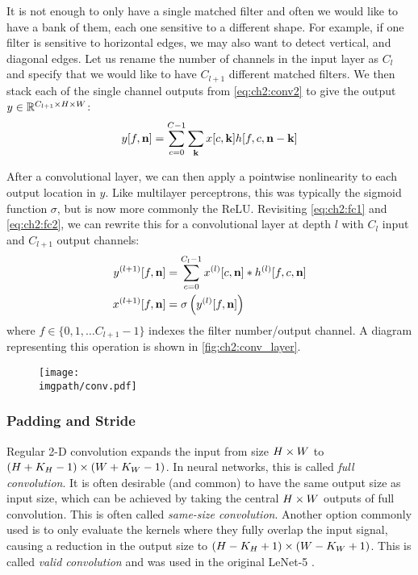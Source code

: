 It is not enough to only have a single matched filter and often we would like to
have a bank of them, each one sensitive to a different shape. For example, if
one filter is sensitive to horizontal edges, we may also want to detect vertical, and
diagonal edges. Let us rename the number of channels in the input layer as
$C_{l}$ and specify that we would like to have $C_{l+1}$ different matched
filters. We then stack each of the single channel outputs from
\eqref{eq:ch2:conv2} to give the output $y \in \reals[C_{l+1} \x H\x W]$:
%
\begin{equation}
  y[f, \nn] = \sum_{c=0}^{C-1} \sum_{\kk} x[c, \kk]h[f, c, \nn-\kk]
  \label{eq:ch2:conv3}
\end{equation}

After a convolutional layer, we can then apply a pointwise nonlinearity to
each output location in $y$. Like multilayer perceptrons, this was typically the
sigmoid function $\sigma$, but is now more commonly the ReLU. Revisiting
\eqref{eq:ch2:fc1} and
\eqref{eq:ch2:fc2}, we can rewrite this for a convolutional layer at depth $l$
with $C_l$ input and $C_{l+1}$ output channels:
\begin{align}
  y^{(l+1)}[f, \nn] &= \sum_{c=0}^{C_l-1} x^{(l)}[c, \nn] \conv h^{(l)}[f, c, \nn]
    \label{eq:ch2:conv4}\\
    x^{(l+1)}[f, \nn] &= \sigma\left(y^{(l)}[f, \nn]\right) \label{eq:ch2:conv4a}
\end{align}
where $f \in \{0, 1,\ldots C_{l+1}-1\}$ indexes the filter number/output channel. A diagram
representing this operation is shown in \autoref{fig:ch2:conv_layer}.

\begin{figure}
  \centering
  \texttt{[image: \\imgpath/conv.pdf]}
  \label{fig:ch2:conv_layer}
\end{figure}

\subsubsection{Padding and Stride}\label{sec:ch2:padding}
Regular 2-D convolution expands the input from size $H\x W$ to $(H+K_H-1)\x
(W+K_W-1)$. In neural networks, this is called \emph{full convolution}.
It is often desirable (and common) to
have the same output size as input size, which can be achieved by
taking the central $H\x W$ outputs of full convolution. This is often
called \emph{same-size convolution}.
Another option commonly used is to only evaluate the kernels where they fully
overlap the input signal, causing a reduction in the output size to $(H-K_H+1)
\x (W-K_W+1)$. This is called \emph{valid convolution} and was used in the
original LeNet-5 \cite{lecun_gradient-based_1998}.

